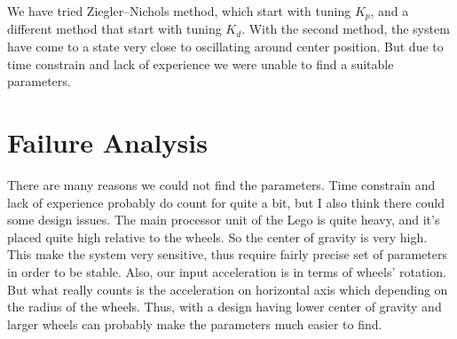 \documentclass{notes}
\begin{document}
We have tried Ziegler–Nichols method, which start with tuning $K_p$, and a different method that
start with tuning $K_d$. With the second method, the system have come to a state very close to
oscillating around center position. But due to time constrain and lack of experience we were unable
to find a suitable parameters.

\section{Failure Analysis}

There are many reasons we could not find the parameters. Time constrain and lack of experience
probably do count for quite a bit, but I also think there could some design issues. The main
processor unit of the Lego is quite heavy, and it's placed quite high relative to the wheels. So the
center of gravity is very high. This make the system very sensitive, thus require fairly precise set
of parameters in order to be stable. Also, our input acceleration is in terms of wheels' rotation.
But what really counts is the acceleration on horizontal axis which depending on the radius of the
wheels. Thus, with a design having lower center of gravity and larger wheels can probably make the
parameters much easier to find.

\end{document}
